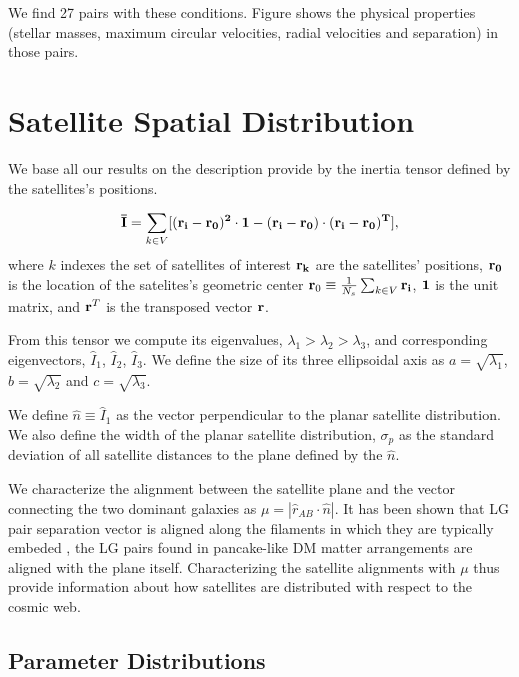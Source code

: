 \documentclass[a4paper,fleqn,usenatbib]{mnras}
\begin{document}
We find 27 pairs with these conditions. Figure shows the physical 
properties (stellar masses, maximum circular velocities, radial
velocities and separation) in those pairs. 




\section{Satellite Spatial Distribution}
\label{sec:SpatialMeasurements}

We base all our results on the description provide by the inertia
tensor defined by the satellites's positions.  

\begin{equation}
{\bf{\bar{I}}} = \sum_{k \in V}[(\bf{r}_i - \bf{r}_0)^2\cdot \bf{1} -
  (\bf{r}_i-\bf{r}_0)\cdot (\bf{r}_i - \bf{r}_0)^{T}],
\end{equation}
%
where $k$ indexes the set of satellites of interest
$\bf{r}_k$ are the satellites' positions, $\bf{r}_{0}$ is the location
of the satelites's geometric center ${\bf r}_{0}\equiv \frac{1}{N_s}\sum_{k\in
  V} \bf{r}_i$, $\bf{1}$ is the unit matrix,  and  
${\bf r}^T$ is the transposed vector $\bf{r}$. 

From this tensor we compute its eigenvalues,
$\lambda_1>\lambda_2>\lambda_3$, and corresponding eigenvectors,
$\hat{I}_1$, $\hat{I}_2$, $\hat{I}_3$.
We define the size of its three ellipsoidal axis as
$a=\sqrt{\lambda_1}$, $b=\sqrt{\lambda_2}$ and $c=\sqrt{\lambda_3}$.

We define $\hat{n}\equiv \hat{I}_1$ as the vector perpendicular to the
planar satellite distribution. 
We also define the width of the planar satellite distribution,
$\sigma_p$ as the standard deviation of all satellite distances to the
plane defined by the $\hat{n}$.

We characterize the alignment between the satellite plane and the
vector connecting the two dominant galaxies as $\mu=|\hat{r}_{AB}\cdot
\hat{n}|$. 
It has been shown that LG pair separation vector is aligned along the
filaments in  which they are typically embeded
\cite{2015ApJ...799...45F}, the LG pairs found in pancake-like DM
matter arrangements are aligned with the plane itself. 
Characterizing the satellite alignments with $\mu$ thus provide
information about how satellites are distributed with respect to the
cosmic web. 

\subsection{Parameter Distributions}
\end{document}
